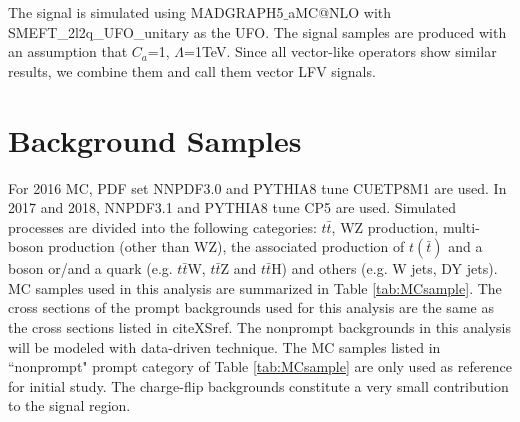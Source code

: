 The signal is simulated using MADGRAPH5$\_$aMC@NLO with SMEFT\_2l2q\_UFO\_unitary as the UFO. The signal samples are produced with an assumption that $C_a$=1, $\Lambda$=1TeV. Since all vector-like operators show similar results, we combine them and call them vector LFV signals. 
\section{Background Samples}
\label{sec:Backgrounds}

For 2016 MC, PDF set NNPDF3.0 and PYTHIA8 tune CUETP8M1 are used. In 2017 and 2018, NNPDF3.1 and PYTHIA8 tune CP5 are used. Simulated processes are divided into the following categories: $t\bar{t}$, WZ production, multi-boson production (other than WZ), the associated production of $t(\bar{t})$ and a boson or/and a quark (e.g. $t\bar{t}$W, $t\bar{t}$Z and $t\bar{t}$H) and others (e.g. W jets, DY jets). MC samples used in this analysis are summarized in Table \ref{tab:MCsample}. The cross sections of the prompt backgrounds used for this analysis are the same as the cross sections listed in cite{XSref}. The nonprompt backgrounds in this analysis will be modeled with data-driven technique. The MC samples listed in ``nonprompt" prompt category of Table \ref{tab:MCsample} are only used as reference for initial study. The charge-flip backgrounds constitute a very small contribution to the signal region.

